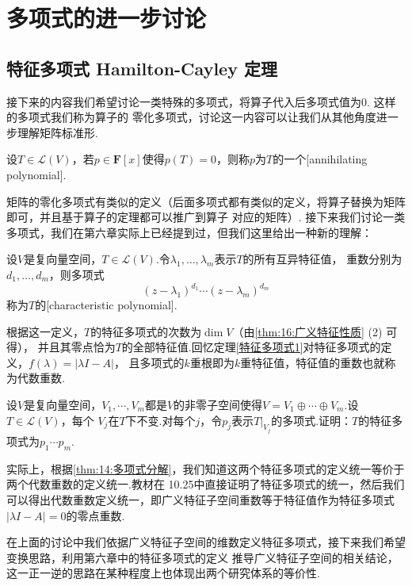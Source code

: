 \chapter{多项式的进一步讨论}

\section{特征多项式 \quad Hamilton-Cayley 定理}
接下来的内容我们希望讨论一类特殊的多项式，将算子代入后多项式值为0. 这样的多项式我们称为算子的
零化多项式，讨论这一内容可以让我们从其他角度进一步理解矩阵标准形.
\begin{definition}
    设$T\in \mathcal{L}(V)$，若$p\in\mathbf{F}[x]$使得$p(T)=0$，则称$p$为$T$的一个[annihilating polynomial].
\end{definition}
矩阵的零化多项式有类似的定义（后面多项式都有类似的定义，将算子替换为矩阵即可，并且基于算子的定理都可以推广到算子
对应的矩阵）. 接下来我们讨论一类多项式，我们在第六章实际上已经提到过，但我们这里给出一种新的理解：
\begin{definition}
    设$V$是复向量空间，$T\in \mathcal{L}(V)$.令$\lambda_1,\ldots,\lambda_m$表示$T$的所有互异特征值，
    重数分别为$d_1,\ldots,d_m$，则多项式\[(z-\lambda_1)^{d_1}\cdots(z-\lambda_m)^{d_m}\]
    称为$T$的[characteristic polynomial].
\end{definition}
根据这一定义，$T$的特征多项式的次数为$\dim V$（由\autoref{thm:16:广义特征性质} (2) 可得）， %
并且其零点恰为$T$的全部特征值.回忆定理\ref{特征多项式1}对特征多项式的定义，$f(\lambda)=|\lambda I-A|$，
且多项式的$k$重根即为$k$重特征值，特征值的重数也就称为代数重数.
\begin{example}
    设$V$是复向量空间，$V_1,\cdots,V_m$都是$V$的非零子空间使得$V=V_1\oplus\cdots\oplus V_m$.设$T\in \mathcal{L}(V)$，每个
    $V_j$在$T$下不变.对每个$j$，令$p_j$表示$T|_{V_j}$的多项式.证明：$T$的特征多项式为$p_1\cdots p_m$.
\end{example}
实际上，根据\autoref{thm:14:多项式分解}，我们知道这两个特征多项式的定义统一等价于两个代数重数的定义统一.教材在
10.25中直接证明了特征多项式的统一，然后我们可以得出代数重数定义统一，即广义特征子空间重数等于特征值作为特征多项式
$|\lambda I-A|=0$的零点重数.

在上面的讨论中我们依据广义特征子空间的维数定义特征多项式，接下来我们希望变换思路，利用第六章中的特征多项式的定义
推导广义特征子空间的相关结论，这一正一逆的思路在某种程度上也体现出两个研究体系的等价性.

